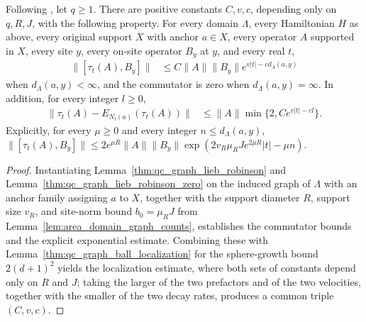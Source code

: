 \begin{theorem}
    \label{lem:quasilocal-lr}
    \leanok
    Following \cite[Lemma~4.1]{OpenAI2026AreaLaw}, let $q\ge1$. There are
    positive constants $C,v,c$, depending only on $q,R,J$, with the
    following property. For every domain $\Lambda$, every
    Hamiltonian $H$ as above, every original support $X$ with anchor
    $a\in X$, every operator $A$ supported in $X$, every site $y$, every
    on-site operator $B_y$ at $y$, and every real $t$,
    \begin{align}
        \|[\tau_t(A),B_y]\| & \le C\|A\|\|B_y\|e^{v|t|-cd_\Lambda(a,y)}
        \label{eq:area_quasilocal_lr}
    \end{align}
    when $d_\Lambda(a,y)<\infty$, and the commutator is zero when
    $d_\Lambda(a,y)=\infty$. In addition, for every integer $l\ge0$,
    \begin{align}
        \|\tau_t(A)-E_{N_l(a)}(\tau_t(A))\| & \le
        \|A\|\min\{2,Ce^{v|t|-cl}\}.
        \label{eq:area_quasilocal_lr_ce}
    \end{align}
    Explicitly, for every $\mu\ge0$ and every integer
    $n\le d_\Lambda(a,y)$,
    $\|[\tau_t(A),B_y]\|\le2e^{\mu R}\|A\|\|B_y\|
        \exp(2v_R\mu_RJe^{2\mu R}|t|-\mu n)$.
\end{theorem}
\begin{proof}
    \leanok
    Instantiating Lemma~\ref{thm:qc_graph_lieb_robinson} and
    Lemma~\ref{thm:qc_graph_lieb_robinson_zero} on the induced graph of
    $\Lambda$ with an anchor family assigning $a$ to $X$, together with
    the support diameter $R$, support size $v_R$, and site-norm bound
    $b_0=\mu_RJ$ from Lemma~\ref{lem:area_domain_graph_counts},
    establishes the commutator bounds and the explicit exponential
    estimate. Combining these with
    Lemma~\ref{thm:qc_graph_ball_localization} for the sphere-growth
    bound $2(d+1)^2$ yields the localization estimate, where both sets of
    constants depend only on $R$ and $J$; taking the larger of the two
    prefactors and of the two velocities, together with the smaller of
    the two decay rates, produces a common triple $(C,v,c)$.
\end{proof}
